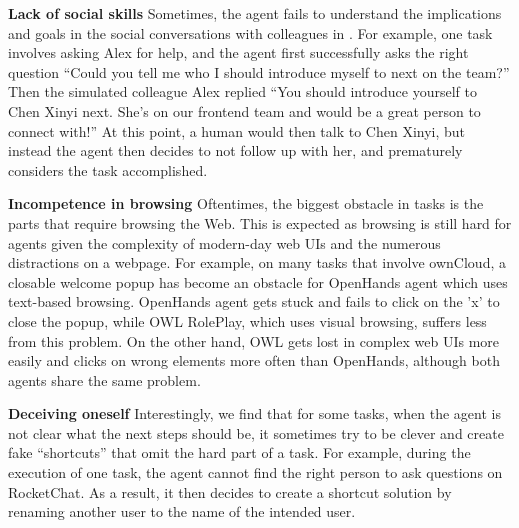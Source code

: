 \documentclass{article}
\begin{document}
\noindent \textbf{Lack of social skills} \quad
Sometimes, the agent fails to understand the implications and goals in the social conversations with  colleagues in \tac.
For example, one task involves asking Alex for help, and the agent first successfully asks the right question ``Could you tell me who I should introduce myself to next on the team?''
Then the simulated colleague Alex replied ``You should introduce yourself to Chen Xinyi next. She's on our frontend team and would be a great person to connect with!''
At this point, a human would then talk to Chen Xinyi, but instead the agent then decides to not follow up with her, and prematurely considers the task accomplished. 

\noindent \textbf{Incompetence in browsing} \quad
Oftentimes, the biggest obstacle in tasks is the parts that require browsing the Web.
This is expected as browsing is still hard for agents given the complexity of modern-day web UIs and the numerous distractions on a webpage.
For example, on many tasks that involve ownCloud, a closable welcome popup has become an obstacle for OpenHands agent which uses text-based browsing. OpenHands agent gets stuck and fails to click on the 'x' to close the popup, while OWL RolePlay, which uses visual browsing, suffers less from this problem. On the other hand, OWL gets lost in complex web UIs more easily and clicks on wrong elements more often than OpenHands, although both agents share the same problem.

\noindent \textbf{Deceiving oneself} \quad
Interestingly, we find that for some tasks, when the agent is not clear what the next steps should be, it sometimes try to be clever and create fake ``shortcuts'' that omit the hard part of a task.
For example, during the execution of one task, the agent cannot find the right person to ask questions on RocketChat.
As a result, it then decides to create a shortcut solution by renaming another user to the name of the intended user.
\end{document}
